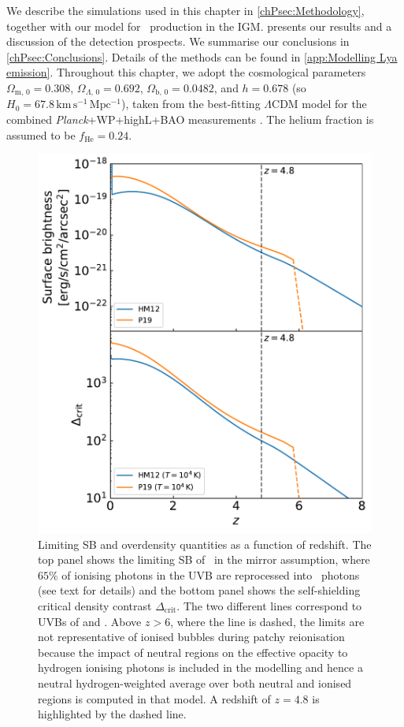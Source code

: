 We describe the simulations used in this chapter in \cref{chPsec:Methodology}, together with our model for \lya\ production in the IGM.  presents our results and a discussion of the detection prospects. We summarise our conclusions in \cref{chPsec:Conclusions}. Details of the methods can be found in \cref{app:Modelling Lya emission}. Throughout this chapter, we adopt the cosmological parameters $\Omega_{\text{m}, \, 0} = 0.308$, $\Omega_{\Lambda, \, 0} = 0.692$, $\Omega_{\text{b}, \, 0} = 0.0482$, and $h=0.678$ (so $H_0 = 67.8 \, \mathrm{km \, s^{-1} \, Mpc^{-1}}$), taken from the best-fitting $\Lambda$CDM model for the combined \textit{Planck}+WP+highL+BAO measurements \citep{2014A&A...571A..16P}. The helium fraction is assumed to be $f_\text{He} = 0.24$.
\begin{figure}
    \centering
    \includegraphics[width=0.6\linewidth]{"Plots/ChapterP/UVB_limits"}
    \caption[Limiting SB and overdensity quantities as a function of redshift]
    {Limiting SB and overdensity quantities as a function of redshift. The top panel shows the limiting SB of \lya\ in the mirror assumption, where $65\%$ of ionising photons in the UVB are reprocessed into \lya\ photons (see text for details) and the bottom panel shows the self-shielding critical density contrast $\Delta_\text{crit}$. The two different lines correspond to UVBs of \citet[, ]{2012ApJ...746..125H} and \citet[, ]{2019MNRAS.485...47P}. Above $z>6$, where the line is dashed, the  limits are not representative of ionised bubbles during patchy reionisation because the impact of neutral regions on the effective opacity to hydrogen ionising photons is included in the modelling  and hence a neutral hydrogen-weighted average over both neutral and ionised regions is computed in that model. A redshift of $z=4.8$ is highlighted by the dashed line.}
    \label{chPfig:UVB_limits}
\end{figure}

